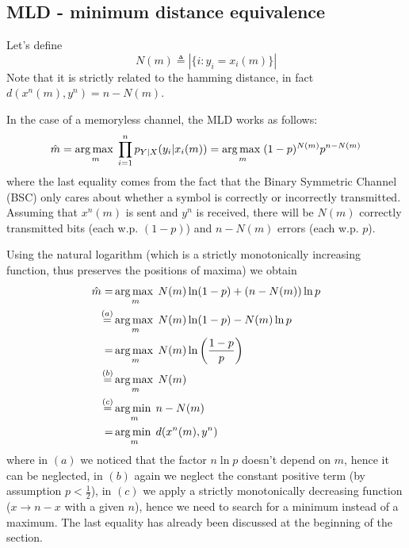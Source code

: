
\subsection{MLD - minimum distance equivalence}
Let's define
%
\begin{equation}
N(m) \triangleq \left|\{ i: y_i=x_i(m) \} \right|
\end{equation}
%
Note that it is strictly related to the hamming distance, in fact $d(x^n(m),y^n) = n-N(m)$.

In the case of a memoryless channel, the MLD works as follows:
%
\begin{equation}
\hat{m} = \operatorname*{arg\,max\;}_m \prod_{i=1}^{n} p_{Y|X}(y_i|x_i(m)) = \operatorname*{arg\,max\;}_m (1-p)^{N(m)} p^{n-N(m)}
\end{equation}
%
where the last equality comes from the fact that the Binary Symmetric Channel (BSC) only cares about whether a symbol is correctly or incorrectly transmitted. Assuming that $x^n(m)$ is sent and $y^n$ is received, there will be $N(m)$ correctly transmitted bits (each w.p. $(1-p)$) and $n-N(m)$ errors (each w.p. $p$).

Using the natural logarithm (which is a strictly monotonically increasing function, thus preserves the positions of maxima) we obtain
%
\begin{align}
\begin{split}
\hat{m} =& \operatorname*{arg\,max\;}_m N(m)\ln(1-p) + (n-N(m)) \ln p\\
\stackrel{(a)}{=}& \operatorname*{arg\,max\;}_m N(m)\ln(1-p) -N(m) \ln p\\
=& \operatorname*{arg\,max\;}_m N(m)\ln\left( \frac{1-p}{p} \right)\\
\stackrel{(b)}{=}& \operatorname*{arg\,max\;}_m N(m)\\
\stackrel{(c)}{=}& \operatorname*{arg\,min\;}_m n-N(m)\\
=& \operatorname*{arg\,min\;}_m d( x^n(m),y^n)
\end{split}
\end{align}
%
where in $(a)$ we noticed that the factor $n \ln p$ doesn't depend on $m$, hence it can be neglected, in $(b)$ again we neglect the constant positive term (by assumption $p<\frac{1}{2}$), in $(c)$ we apply a strictly monotonically decreasing function ($x \rightarrow n-x$ with a given $n$), hence we need to search for a minimum instead of a maximum. The last equality has already been discussed at the beginning of the section.

